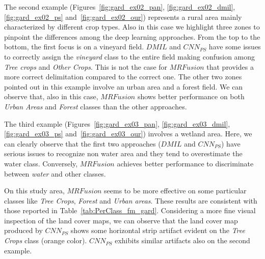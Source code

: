 \documentclass[journal]{IEEEtran}
\newcommand{\method}{$MRFusion$}
\begin{document}
The second example (Figures~\ref{fig:gard_ex02_pan}, \ref{fig:gard_ex02_dmil}, \ref{fig:gard_ex02_ps} and~\ref{fig:gard_ex02_our}) represents a rural area mainly characterized by different crop types. Also in this case we highlight three zones to pinpoint the differences among the deep learning approaches. From the top to the bottom, the first focus is on a vineyard field. $DMIL$ and $CNN_{PS}$ have some issues to correctly assign the \textit{vineyard} class to the entire field making confusion among \textit{Tree crops} and \textit{Other Crops}. This is not the case for \method{} that provides a more correct delimitation compared to the correct one. The other two zones pointed out in this example involve an urban area and a forest field. We can observe that, also in this case, \method{} shows better performance on both \textit{Urban Areas} and \textit{Forest} classes than the other approaches.

The third example (Figures~\ref{fig:gard_ex03_pan}, \ref{fig:gard_ex03_dmil}, \ref{fig:gard_ex03_ps} and~\ref{fig:gard_ex03_our}) involves a wetland area. Here, we can clearly observe that the first two approaches ($DMIL$ and $CNN_{PS}$) have serious issues to recognize non water area and they tend to overestimate the water class. Conversely, \method{} achieves better performance to discriminate between \textit{water} and other classes. 

On this study area, \method{} seems to be more effective on some particular classes like \textit{Tree Crops}, \textit{Forest} and \textit{Urban areas}. These results are consistent with those reported in Table~\ref{tab:PerClass_fm_gard}. 
Considering a more fine visual inspection of the land cover maps, we can observe that the land cover map produced by $CNN_{PS}$ shows some horizontal strip artifact evident on the \textit{Tree Crops} class (orange color). $CNN_{PS}$ exhibits similar artifacts also on the second example. 
\end{document}
